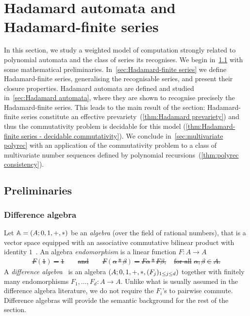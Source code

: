 \section{Hadamard automata and Hadamard-finite series}
\label{sec:Hadamard}

In this section, we study a weighted model of computation strongly related to polynomial automata
and the class of series its recognises.
%
We begin in~\cref{sec:Hadamard:preliminaries} with some mathematical preliminaries.
%
In~\cref{sec:Hadamard-finite series} we define Hadamard-finite series, generalising the recognisable series,
and present their closure properties.
%
Hadamard automata are defined and studied in~\cref{sec:Hadamard automata},
where they are shown to recognise precisely the Hadamard-finite series.
%
This leads to the main result of the section:
Hadamard-finite series constitute an effective prevariety~(\cref{thm:Hadamard prevariety})
and thus the commutativity problem is decidable for this model\-
(\cref{thm:Hadamard-finite series - decidable commutativity}).
%
We conclude in~\cref{sec:multivariate polyrec} with an application of the commutativity problem
to a class of multivariate number sequences defined by polynomial recursions~(\cref{thm:polyrec consistency}).

\subsection{Preliminaries}
\label{sec:Hadamard:preliminaries}

\subsubsection{Difference algebra}
\label{sec:difference algebra}

Let $\mathbb A = (A; 0, 1, {+}, {*})$ be an \emph{algebra} (over the field of rational numbers),
that is a vector space equipped with an associative commutative bilinear product
with identity $1$~\cite[Ch.~3, §1]{Bourbaki:Algebra:I:1974}.
%
An algebra \emph{endomorphism} is a linear function $F : A \to A$ \st
%
\begin{align}
    \label{eq:endomorphism}
    \tag{endomorphism rule}
    F(1) = 1
        \qquad\text{and}\qquad
        F(\alpha * \beta) = F \alpha * F \beta,
        \quad\text{for all } \alpha, \beta \in A.
\end{align}
%
A \emph{difference algebra}~\cite{RMCohn:DifferenceAlgebra:1965,Levin:DifferenceAlgebra:2008}
is an algebra $(A; 0, 1, {+}, {*}, (F_j)_{1\leq j\leq d})$
together with finitely many endomorphisms $F_1, \dots, F_d : A \to A$.
%
Unlike what is usually assumed in the difference algebra literature,
we do not require the $F_i$'s to pairwise commute.
%
Difference algebras will provide the semantic background for the rest of the section.

